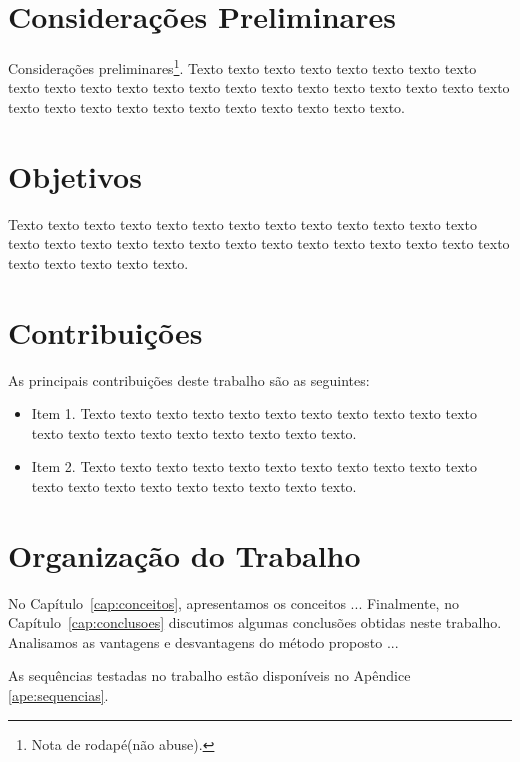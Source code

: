 


\section{Considerações Preliminares}
\label{sec:consideracoes_preliminares}

Considerações preliminares\footnote{Nota de rodapé(não abuse).}.
Texto texto texto texto texto texto texto texto texto texto texto texto texto
texto texto texto texto texto texto texto texto texto texto texto texto texto
texto texto texto texto texto texto texto.
 

\section{Objetivos}
\label{sec:objetivo}

Texto texto texto texto texto texto texto texto texto texto texto texto texto
texto texto texto texto texto texto texto texto texto texto texto texto texto
texto texto texto texto texto texto.

\section{Contribuições}
\label{sec:contribucoes}

As principais contribuições deste trabalho são as seguintes:

\begin{itemize}
  \item Item 1. Texto texto texto texto texto texto texto texto texto texto
  texto texto texto texto texto texto texto texto texto texto.

  \item Item 2. Texto texto texto texto texto texto texto texto texto texto
  texto texto texto texto texto texto texto texto texto texto.

\end{itemize}

\section{Organização do Trabalho}
\label{sec:organizacao_trabalho}

No Capítulo~\ref{cap:conceitos}, apresentamos os conceitos ... Finalmente, no
Capítulo~\ref{cap:conclusoes} discutimos algumas conclusões obtidas neste
trabalho. Analisamos as vantagens e desvantagens do método proposto ... 

As sequências testadas no trabalho estão disponíveis no Apêndice \ref{ape:sequencias}.
